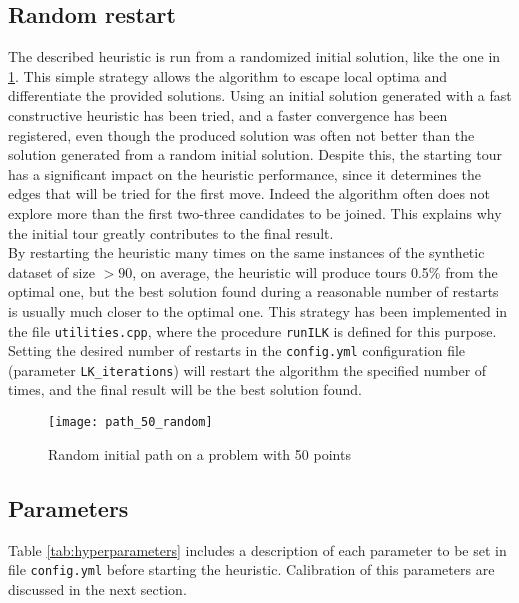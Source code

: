 \subsection{Random restart}
The described heuristic is run from a randomized initial solution, like the one in \cref{fig:randomtour}. This simple strategy allows the algorithm to escape local optima and differentiate the provided solutions. Using an initial solution generated with a fast constructive heuristic has been tried, and a faster convergence has been registered, even though the produced solution was often not better than the solution generated from a random initial solution.
Despite this, the starting tour has a significant impact on the heuristic performance, since it determines the edges that will be tried for the first move. Indeed the algorithm often does not explore more than the first two-three candidates to be joined. This explains why the initial tour greatly contributes to the final result.\\
By restarting the heuristic many times on the same instances of the synthetic dataset of size $> 90$, on average, the heuristic will produce tours 0.5\% from the optimal one, but the best solution found during a reasonable number of restarts is usually much closer to the optimal one. This strategy has been implemented in the file \texttt{utilities.cpp}, where the procedure \texttt{runILK} is defined for this purpose. Setting the desired number of restarts in the \texttt{config.yml} configuration file (parameter \texttt{LK\_iterations}) will restart the algorithm the specified number of times, and the final result will be the best solution found.

\begin{figure}[h]
	\centering
	\texttt{[image: path\_50\_random]}
	\caption{Random initial path on a problem with 50 points}
	\label{fig:randomtour}
\end{figure}

\clearpage
\subsection{Parameters}
\label{ssec:hyperpar}
Table \ref{tab:hyperparameters} includes a description of each parameter to be set in file \texttt{config.yml} before starting the heuristic. Calibration of this parameters are discussed in the next section.


